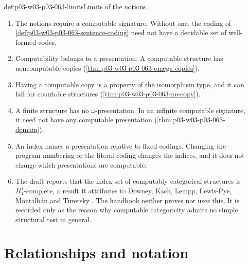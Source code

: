 \begin{hbwarning}{def:p03-w03-p03-063-limits}{Limits of the notions}
\begin{enumerate}
\item The notions require a computable signature.  Without one, the coding
  of \cref{def:p03-w03-p03-063-sentence-coding} need not have a decidable
  set of well-formed codes.
\item Computability belongs to a presentation.  A computable structure has
  noncomputable copies (\cref{thm:p03-w03-p03-063-omega-copies}).
\item Having a computable copy is a property of the isomorphism type, and it
  can fail for countable structures (\cref{thm:p03-w03-p03-063-no-copy}).
\item A finite structure has no \(\omega\)-presentation.  In an infinite
  computable signature, it need not have any computable presentation
  (\cref{thm:p03-w03-p03-063-domain}).
\item An index names a presentation relative to fixed codings.  Changing the
  program numbering or the literal coding changes the indices, and it does not
  change which presentations are computable.
\item The draft reports that the index set of computably categorical
  structures is \(\Pi^1_1\)-complete, a result it attributes to Downey,
  Kach, Lempp, Lewis-Pye, Montalb\'an and Turetsky
  \cite[p.~124]{Montalban2019CSTDraft}.  The handbook neither proves nor uses
  this.  It is recorded only as the reason why computable categoricity
  admits no simple structural test in general.
\end{enumerate}
\end{hbwarning}

\section{Relationships and notation}
\label{sec:p03-w03-p03-063-relations}

